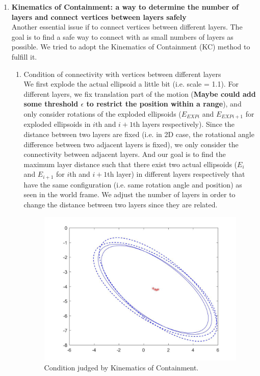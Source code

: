 \documentclass{article}
\begin{document}
\begin{enumerate}
\item {\bf Kinematics of Containment: a way to determine the number of layers and connect vertices between layers safely}\\
Another essential issue if to connect vertices between different layers. The goal is to find a safe way to connect with as small numbers of layers as possible. We tried to adopt the Kinematics of Containment (KC) method to fulfill it.

\begin{enumerate}
\item Condition of connectivity with vertices between different layers\\
We first explode the actual ellipsoid a little bit (i.e. scale = 1.1). For different layers, we fix translation part of the motion ({\bf Maybe could add some threshold $\epsilon$ to restrict the position within a range}), and only consider rotations of the exploded ellipsoids ($E_{EXPi}$ and $E_{EXPi+1}$ for exploded ellipsoids in $i$th and $i+1$th layers respectively). Since the distance between two layers are fixed (i.e. in 2D case, the rotational angle difference between two adjacent layers is fixed), we only consider the connectivity between adjacent layers. And our goal is to find the maximum layer distance such that there exist two actual ellipsoids ($E_i$ and $E_{i+1}$ for $i$th and $i+1$th layer) in different layers respectively that have the same configuration (i.e. same rotation angle and position) as seen in the world frame. We adjust the number of layers in order to change the distance between two layers since they are related.
	
\begin{figure}
\centering
\includegraphics[scale = 0.2]{KC.jpg}
\caption{Condition judged by Kinematics of Containment.}
\label{fig:KC}
\end{figure}
	

\end{enumerate}
\end{enumerate}
\end{document}
